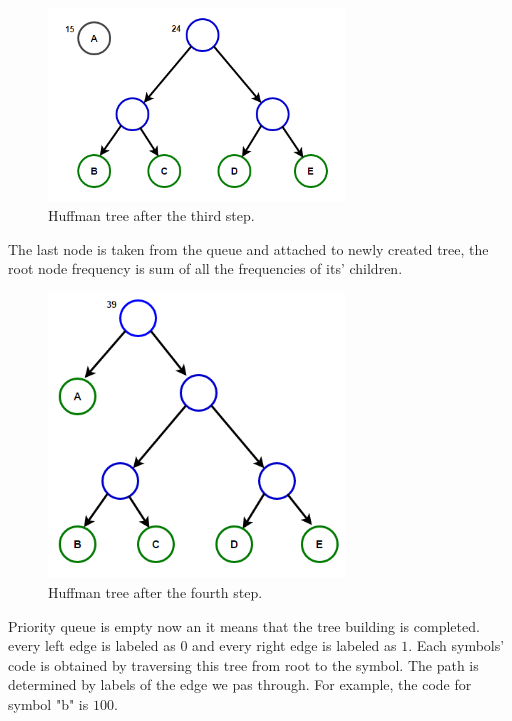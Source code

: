 \begin{figure}[!ht]
    \includegraphics[width=0.7\textwidth]{figure/huffman-3.png}
    \caption{Huffman tree after the third step.}
    \label{huffman-3}
\end{figure}

The last node is taken from the queue and attached to newly created tree, the root node frequency is sum of all the frequencies of its' children.

\begin{figure}[!ht]
    \includegraphics[width=0.7\textwidth]{figure/huffman-4.png}
    \caption{Huffman tree after the fourth step.}
    \label{huffman-4}
\end{figure}

Priority queue is empty now an it means that the tree building is completed. every left edge is labeled as $0$ and every right edge is labeled as $1$. Each symbols' code is obtained by traversing this tree from root to the symbol. The path is determined by labels of the edge we pas through. For example, the code for symbol "b" is $100$.

